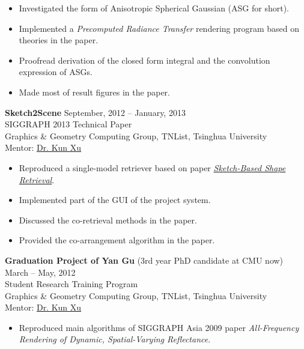 \documentclass[10pt]{res} %
\begin{document}
\begin{resume}
\begin{itemize} \itemsep -2pt %
\item Investigated the form of Anisotropic Spherical Gaussian (ASG for short).
\item Implemented a {\sl Precomputed Radiance Transfer} rendering program based on theories in the paper.
\item Proofread derivation of the closed form integral and the convolution expression of ASGs.
\item Made most of result figures in the paper.
\end{itemize}

{\bf \large Sketch2Scene} \hfill September, 2012 -- January, 2013 \\
SIGGRAPH 2013 Technical Paper \\
Graphics \& Geometry Computing Group, TNList, Tsinghua University \\
Mentor: \href{http://cg.cs.tsinghua.edu.cn/people/~kun/}{Dr. Kun Xu}

\begin{itemize} \itemsep -2pt %
\item Reproduced a single-model retriever based on paper
\href{http://cybertron.cg.tu-berlin.de/eitz/pdf/2012_siggraph_sbsr.pdf}{\sl Sketch-Based Shape Retrieval}.
\item Implemented part of the GUI of the project system.
\item Discussed the co-retrieval methods in the paper.
\item Provided the co-arrangement algorithm in the paper.
\end{itemize}

{\bf \large Graduation Project of Yan Gu} (3rd year PhD candidate at CMU now) \hfill March -- May, 2012 \\
Student Research Training Program \\
Graphics \& Geometry Computing Group, TNList, Tsinghua University \\
Mentor: \href{http://cg.cs.tsinghua.edu.cn/people/~kun/}{Dr. Kun Xu}

\begin{itemize} \itemsep -2pt %
\item Reproduced main algorithms of SIGGRAPH Asia 2009 paper {\sl All-Frequency Rendering of Dynamic, Spatial-Varying Reflectance}.
\end{itemize}



\end{resume}
\end{document}
